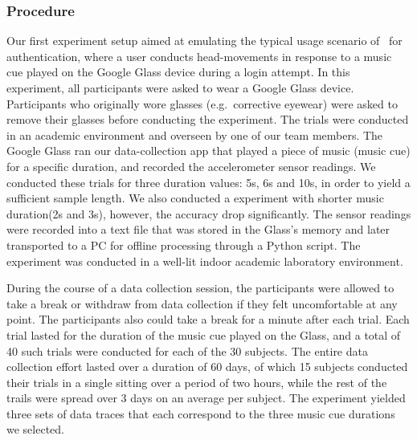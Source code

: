 \subsubsection{Procedure}
Our first experiment setup aimed at emulating the typical usage scenario
of \systemname~for authentication, where a user conducts head-movements in
response to a music cue played on the Google Glass device during a login
attempt.
In this experiment, all participants were asked to wear a Google Glass
device. Participants who originally wore glasses (e.g.~corrective eyewear) were asked to remove their
glasses before conducting the experiment.
The trials were conducted in an academic environment and overseen by one of
our team members.
The Google Glass ran our data-collection app that played a piece of
music (music cue) for a specific duration, and recorded the accelerometer
sensor readings. We conducted these trials for three duration values: 5s,
6s and 10s, in order to yield a sufficient sample length. We also conducted a experiment with shorter music duration(2s and 3s), however, the accuracy drop significantly. %
The sensor readings were recorded into a text file that was stored
in the Glass's memory and later transported to a PC for offline processing
through a Python script. The experiment was conducted in a well-lit indoor
academic laboratory environment.

During the course of a data collection session, the participants were allowed to take a
break or withdraw from data collection if they felt uncomfortable at any
point.%
The participants also could take a break for a minute after each trial.
Each trial lasted for the duration of the music cue played on the Glass, and
a total of 40 such trials were conducted for each of the 30 subjects.
The entire data collection effort lasted over a duration of 60 days, of which 15
subjects conducted their trials in a single sitting over a period of two
hours, while the rest of the trails were spread over 3 days on an average per
subject.
The experiment yielded three sets of data traces that each correspond to
the three music cue durations we selected.

